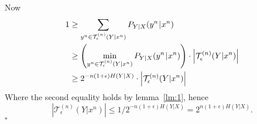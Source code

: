 \documentclass[12pt]{article}
\begin{document}
Now 
\begin{align*}
  1 &\geq \sum_{y^n \in \mathcal{T}^{(n)}_\epsilon(Y | x^n)} P_{Y|X}(y^n \mskip1mu|\mskip1mu x^n) \\
  &\geq \left( \min_{y^n \in \mathcal{T}^{(n)}_\epsilon(Y | x^n)} P_{Y|X}(y^n \mskip1mu|\mskip1mu x^n) \right) \cdot \left\lvert 
  \mathcal{T}^{(n)}_\epsilon(Y | x^n) \right\rvert \\
  & \geq 2^{-n (1+\epsilon) H(Y | X)} \cdot \left\lvert \mathcal{T}^{(n)}_\epsilon(Y | x^n) \right\rvert
\end{align*}
Where the second equality holds by lemma~\ref{lm:1}, hence
\[ \left\lvert \mathcal{T}^{(n)}_\epsilon(Y | x^n) \right\rvert \leq 1 / 2^{-n (1+\epsilon) H(Y | X)} = 
  2^{n (1+\epsilon) H(Y | X)}. \] \hfill\ensuremath{\square} 
\end{document}
